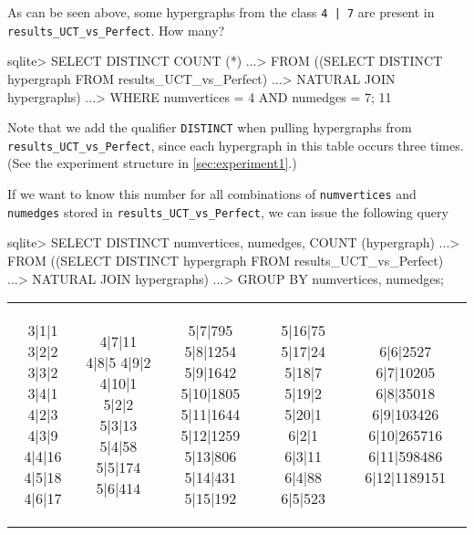 As can be seen above, some hypergraphs from the class \texttt{4 | 7} are present in \texttt{results\_UCT\_vs\_Perfect}. How many?
\begin{code}
sqlite> SELECT DISTINCT COUNT (*)
   ...> FROM ((SELECT DISTINCT hypergraph FROM results_UCT_vs_Perfect)
   ...>       NATURAL JOIN hypergraphs)
   ...> WHERE numvertices = 4 AND numedges = 7;
11
\end{code}
Note that we add the qualifier \texttt{DISTINCT} when pulling hypergraphs from \texttt{results\_UCT\_vs\_Perfect}, since each hypergraph in this table occurs three times. (See the experiment structure in \ref{sec:experiment1}.)

If we want to know this number for all combinations of \texttt{numvertices} and \texttt{numedges} stored in \texttt{results\_UCT\_vs\_Perfect}, we can issue the following query
\begin{code}
sqlite> SELECT DISTINCT numvertices, numedges, COUNT (hypergraph)
   ...> FROM ((SELECT DISTINCT hypergraph FROM results_UCT_vs_Perfect)
   ...>       NATURAL JOIN hypergraphs)
   ...> GROUP BY numvertices, numedges;
\end{code}
\begin{tabular}{|c|c|c|c|c|}
\begin{minipage}{1.0in}
\begin{datalisting}
3|1|1
3|2|2
3|3|2
3|4|1
4|2|3
4|3|9
4|4|16
4|5|18
4|6|17
\end{datalisting}
\end{minipage}
&
\begin{minipage}{1.0in}
\begin{datalisting}
4|7|11
4|8|5
4|9|2
4|10|1
5|2|2
5|3|13
5|4|58
5|5|174
5|6|414
\end{datalisting}
\end{minipage}
&
\begin{minipage}{1.0in}
\begin{datalisting}
5|7|795
5|8|1254
5|9|1642
5|10|1805
5|11|1644
5|12|1259
5|13|806
5|14|431
5|15|192
\end{datalisting}
\end{minipage}
&
\begin{minipage}{1.0in}
\begin{datalisting}
5|16|75
5|17|24
5|18|7
5|19|2
5|20|1
6|2|1
6|3|11
6|4|88
6|5|523
\end{datalisting}
\end{minipage}
&
\begin{minipage}{1.0in}
\begin{datalisting}
6|6|2527
6|7|10205
6|8|35018
6|9|103426
6|10|265716
6|11|598486
6|12|1189151
\end{datalisting}
\end{minipage}
\\
\end{tabular}

